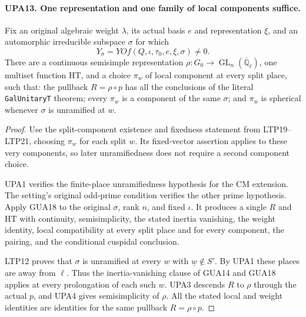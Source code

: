 \paragraph{UPA13. One representation and one family of local components suffice.}
\label{claim:UPA13}
Fix an original algebraic weight $\lambda$, its actual basis
$e$ and representation $\xi$, and an automorphic irreducible
subspace $\sigma$ for which
\[
                         Y_\sigma=YOf(Q,\iota,\tau_0,e,\xi,\sigma)
                                      \ne0.
 \tag{UPA.19}
\]
There are a continuous semisimple representation
$\rho:G_0\to\operatorname{GL}_n(\overline{\mathbb Q}_\ell)$,
one multiset function $\mathrm{HT}$, and a choice
$\pi_w$ of local component at every split place, such that:
the pullback $R=\rho\circ p$ has all the conclusions of
the literal \texttt{GalUnitaryT} theorem; every $\pi_w$
is a component of the same $\sigma$; and $\pi_w$ is spherical
whenever $\sigma$ is unramified at $w$.
\begin{proof}
Use the split-component existence and fixedness statement
from LTP19--LTP21, choosing $\pi_w$ for
each split $w$.  Its fixed-vector assertion applies to
these very components, so later unramifiedness does not
require a second component choice.

UPA1 verifies the finite-place unramifiedness hypothesis
for the CM extension.  The setting's original odd-prime
condition verifies the other prime hypothesis.  Apply
GUA18 to the original $\sigma$,
rank $n$, and fixed $\iota$.  It produces a single $R$
and $\mathrm{HT}$ with continuity, semisimplicity,
the stated inertia vanishing, the weight identity,
local compatibility at every split place and for every
component, the pairing, and the conditional cuspidal
conclusion.

LTP12 proves that $\sigma$ is
unramified at every $w$ with $\underline w\notin S'$.
By UPA1 these places are away from $\ell$.  Thus the
inertia-vanishing clause of GUA14 and GUA18
applies at every prolongation of each such $w$.
UPA3 descends $R$ to $\rho$ through the actual $p$,
and UPA4 gives semisimplicity of $\rho$.
All the stated local and weight identities are
identities for the same pullback $R=\rho\circ p$.
\end{proof}

